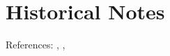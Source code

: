 \chapter{Historical Notes}
\label{ch:cad-historical-notes}

References: \cite{PieglBook1996}, \cite{DeBoor_Book2001}, \cite{farin2002curves, farin1999nurbs, prautzsch2002bezier,rogers2001introduction,cohen2001geometric}




